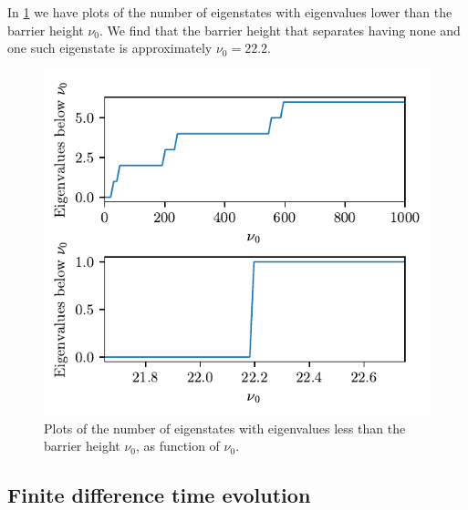 In \cref{fig:eigenvalues_roots} we have plots of the number of eigenstates with eigenvalues lower than the barrier height $\nu_0$. We find that the barrier height that separates having none and one such eigenstate is approximately $\nu_0 = 22.2$.
\begin{figure}[ht!]%
\centering%
\includegraphics{figs/number_of_roots.pdf}%
\caption{Plots of the number of eigenstates with eigenvalues less than the barrier height $\nu_0$, as function of $\nu_0$. \label{fig:eigenvalues_roots}}%
\end{figure}

\subsection*{Finite difference time evolution}

